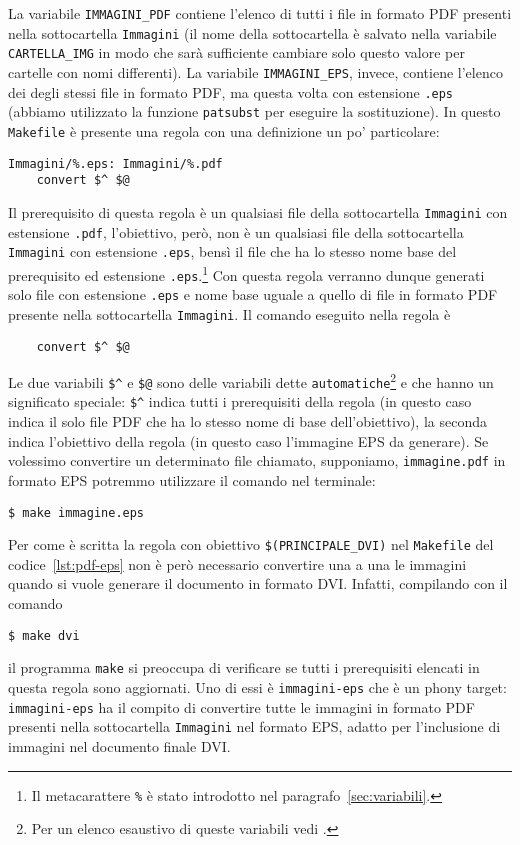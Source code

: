 La variabile \texttt{IMMAGINI\_PDF} contiene l'elenco di tutti i file in formato
\textsc{PDF} presenti nella sottocartella \texttt{Immagini} (il nome della
sottocartella è salvato nella variabile \texttt{CARTELLA\_IMG} in modo che sarà
sufficiente cambiare solo questo valore per cartelle con nomi differenti).  La
variabile \texttt{IMMAGINI\_EPS}, invece, contiene l'elenco dei degli stessi
file in formato \textsc{PDF}, ma questa volta con estensione \texttt{.eps}
(abbiamo utilizzato la funzione \texttt{patsubst} per eseguire la sostituzione).
In questo \texttt{Makefile} è presente una regola con una definizione un po'
particolare:
\begin{lstlisting}
Immagini/%.eps: Immagini/%.pdf
	convert $^ $@
\end{lstlisting}
Il prerequisito di questa regola è un qualsiasi file della sottocartella
\texttt{Immagini} con estensione \texttt{.pdf}, l'obiettivo, però, non è un
qualsiasi file della sottocartella \texttt{Immagini} con estensione
\texttt{.eps}, bensì il file che ha lo stesso nome base del prerequisito ed
estensione
\texttt{.eps}.\footnote{Il metacarattere \texttt{\%} è stato introdotto nel
  paragrafo~\ref{sec:variabili}.}
Con questa regola verranno dunque generati solo file con estensione
\texttt{.eps} e nome base uguale a quello di file in formato \textsc{PDF}
presente nella sottocartella \texttt{Immagini}.  Il comando eseguito nella
regola è
\begin{lstlisting}
	convert $^ $@
\end{lstlisting}
Le due variabili \texttt{\$\^} e \texttt{\$@} sono delle variabili dette
\texttt{automatiche}\footnote{Per un elenco esaustivo di queste variabili vedi
  \textcite[112]{gnu:make}.}
e che hanno un significato speciale: \texttt{\$\^} indica tutti i prerequisiti
della regola (in questo caso indica il solo file \textsc{PDF} che ha lo stesso
nome di base dell'obiettivo), la seconda indica l'obiettivo della regola (in
questo caso l'immagine \textsc{EPS} da generare).  Se volessimo convertire un
determinato file chiamato, supponiamo, \texttt{immagine.pdf} in formato
\textsc{EPS} potremmo utilizzare il comando nel terminale:
\begin{verbatim}
$ make immagine.eps
\end{verbatim} %
Per come è scritta la regola con obiettivo \texttt{\$(PRINCIPALE\_DVI)} nel
\texttt{Makefile} del codice~\ref{lst:pdf-eps} non è però necessario convertire
una a una le immagini quando si vuole generare il documento in formato
\textsc{DVI}.  Infatti, compilando con il comando
\begin{verbatim}
$ make dvi
\end{verbatim} %
il programma \texttt{make} si preoccupa di verificare se tutti i prerequisiti
elencati in questa regola sono aggiornati.  Uno di essi è \texttt{immagini-eps}
che è un phony target: \texttt{immagini-eps} ha il compito di convertire tutte
le immagini in formato \textsc{PDF} presenti nella sottocartella
\texttt{Immagini} nel formato \textsc{EPS}, adatto per l'inclusione di immagini
nel documento finale \textsc{DVI}.

